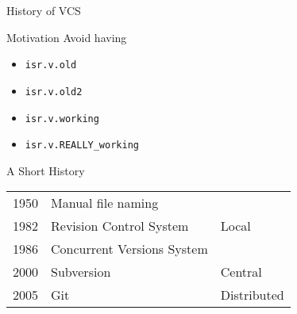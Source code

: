 \documentclass[table,dvipsnames]{beamer}
\begin{document}
\begin{frame}{History of VCS}
	\begin{block}{Motivation}
		Avoid having
		\begin{itemize}
			\item \texttt{isr.v.old}
			\item \texttt{isr.v.old2}
			\item \texttt{isr.v.working}
			\item \texttt{isr.v.REALLY\_working}
		\end{itemize}
	\end{block}
	\begin{block}{A Short History}
		\begin{tabular}{lll}
			\rowcolor{RoyalBlue!50}
			1950 & Manual file naming			& \\ 
			\rowcolor{RoyalBlue!50}
			1982 & Revision Control System		& \multirow{-2}{*}{Local} \\ 
			\rowcolor{RoyalBlue!25}
			1986 & Concurrent Versions System	& \\
			\rowcolor{RoyalBlue!25}
			2000 & Subversion					& \multirow{-2}{*}{Central} \\ 
			\rowcolor{RoyalBlue!50}
			2005 & Git							& Distributed \\ 
		\end{tabular}
	\end{block}
\end{frame}
\end{document}
